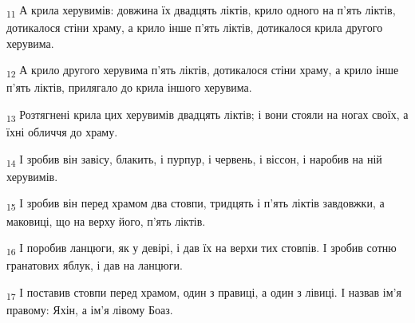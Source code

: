 \begin{tcolorbox}
\textsubscript{11} А крила херувимів: довжина їх двадцять ліктів, крило одного на п'ять ліктів, дотикалося стіни храму, а крило інше п'ять ліктів, дотикалося крила другого херувима.
\end{tcolorbox}
\begin{tcolorbox}
\textsubscript{12} А крило другого херувима п'ять ліктів, дотикалося стіни храму, а крило інше п'ять ліктів, прилягало до крила іншого херувима.
\end{tcolorbox}
\begin{tcolorbox}
\textsubscript{13} Розтягнені крила цих херувимів двадцять ліктів; і вони стояли на ногах своїх, а їхні обличчя до храму.
\end{tcolorbox}
\begin{tcolorbox}
\textsubscript{14} І зробив він завісу, блакить, і пурпур, і червень, і віссон, і наробив на ній херувимів.
\end{tcolorbox}
\begin{tcolorbox}
\textsubscript{15} І зробив він перед храмом два стовпи, тридцять і п'ять ліктів завдовжки, а маковиці, що на верху його, п'ять ліктів.
\end{tcolorbox}
\begin{tcolorbox}
\textsubscript{16} І поробив ланцюги, як у девірі, і дав їх на верхи тих стовпів. І зробив сотню гранатових яблук, і дав на ланцюги.
\end{tcolorbox}
\begin{tcolorbox}
\textsubscript{17} І поставив стовпи перед храмом, один з правиці, а один з лівиці. І назвав ім'я правому: Яхін, а ім'я лівому Боаз.
\end{tcolorbox}
